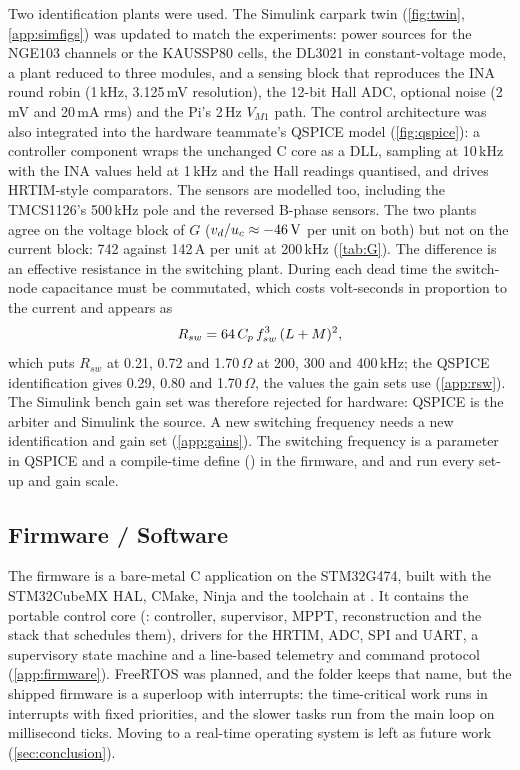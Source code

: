 Two identification plants were used. The Simulink carpark twin (\cref{fig:twin}, \cref{app:simfigs}) was updated to match the experiments: power sources for the NGE103 channels or the KAUSSP80 cells, the DL3021 in constant-voltage mode, a plant reduced to three modules, and a sensing block that reproduces the INA round robin (1\,kHz, 3.125\,mV resolution), the 12-bit Hall ADC, optional noise (2\,mV and 20\,mA rms) and the Pi's 2\,Hz $V_{M1}$ path. The control architecture was also integrated into the hardware teammate's QSPICE model (\cref{fig:qspice}): a controller component wraps the unchanged C core as a DLL, sampling at 10\,kHz with the INA values held at 1\,kHz and the Hall readings quantised, and drives HRTIM-style comparators. The sensors are modelled too, including the TMCS1126's 500\,kHz pole and the reversed B-phase sensors.
The two plants agree on the voltage block of $G$ ($v_{d}/u_{c} \approx -46\,\mathrm{V}$ per unit on both) but not on the current block: 742 against 142\,A per unit at 200\,kHz (\cref{tab:G}). The difference is an effective resistance in the switching plant. During each dead time the switch-node capacitance must be commutated, which costs volt-seconds in proportion to the current and appears as
\begin{equation}
  R_{sw} = 64\,C_p\,f_{sw}^3\,(L+M)^2,
\end{equation}
which puts $R_{sw}$ at 0.21, 0.72 and 1.70\,$\Omega$ at 200, 300 and 400\,kHz; the QSPICE identification gives 0.29, 0.80 and 1.70\,$\Omega$, the values the gain sets use (\cref{app:rsw}). The Simulink bench gain set was therefore rejected for hardware: QSPICE is the arbiter and Simulink the source. A new switching frequency needs a new identification and gain set (\cref{app:gains}). The switching frequency is a parameter in QSPICE and a compile-time define () in the firmware, and  and  run every set-up and gain scale.

\subsection{Firmware / Software}
\label{sec:firmware}
The firmware is a bare-metal C application on the STM32G474, built with the STM32CubeMX HAL, CMake, Ninja and the  toolchain at . It contains the portable control core (: controller, supervisor, MPPT, reconstruction and the stack that schedules them), drivers for the HRTIM, ADC, SPI and UART, a supervisory state machine and a line-based telemetry and command protocol (\cref{app:firmware}). FreeRTOS was planned, and the  folder keeps that name, but the shipped firmware is a superloop with interrupts: the time-critical work runs in interrupts with fixed priorities, and the slower tasks run from the main loop on millisecond ticks. Moving to a real-time operating system is left as future work (\cref{sec:conclusion}).

